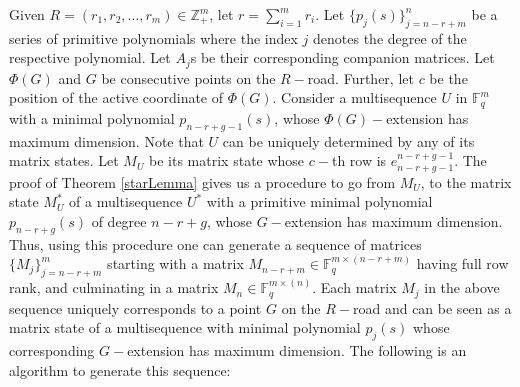 \documentclass[letterpaper, 12 pt]{article}  \usepackage{amssymb}
\newcommand{\F}{\mathbb{F}}
\begin{document}
Given $R=(r_1,r_2,\ldots,r_m) \in \mathbb{Z}_+^m$, let $r = \sum_{i=1}^mr_i$.
Let $\{p_j(s)\}_{j = n-r+m}^n$ be a series of primitive polynomials where the
index $j$ denotes the degree of the respective polynomial. Let $A_j$s be
their corresponding companion matrices. Let $\Phi(G)$ and $G$ be consecutive
points on the $R-$road. Further, let $c$ be the position of the active
coordinate of $\Phi(G)$. Consider a multisequence $U$ in $\F_q^m$ with a minimal
polynomial $p_{n-r+g-1}(s)$, whose $\Phi(G)-$extension has maximum dimension.
Note that $U$ can be uniquely determined by any of its matrix states. Let $M_U$
be its matrix state whose $c-$th row is $e_{n-r+g-1}^{n-r+g-1}$. The proof of
Theorem \ref{starLemma} gives us a procedure to go from $M_U$, to the matrix
state $M_U^*$ of a multisequence $U^*$ with a primitive minimal polynomial
$p_{n-r+g}(s)$ of degree $n-r+g$, whose $G-$extension has maximum dimension.
Thus, using this procedure one can generate a sequence of matrices
$\{M_j\}_{j=n-r+m}^m$ starting with a matrix $M_{n-r+m} \in \F_q^{m \times
(n-r+m)}$ having full row rank, and culminating in a matrix  $M_n \in \F_q^{m
\times (n)}$. Each matrix $M_j$ in the above sequence uniquely corresponds to a
point $G$ on the $R-$road and can be seen as a matrix state of a multisequence
with minimal polynomial $p_j(s)$ whose corresponding $G-$extension has maximum
dimension. The following is an algorithm to generate this sequence: 
  
\end{document}
